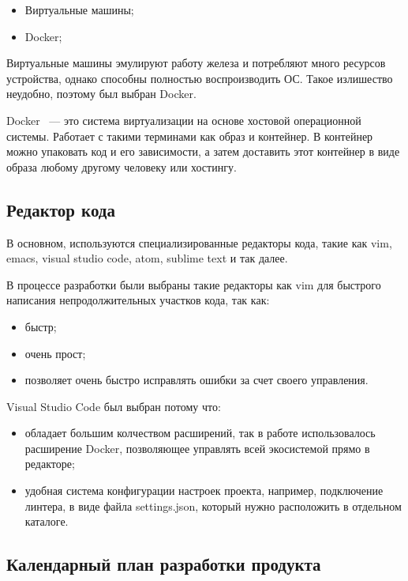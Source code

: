 \begin{itemize}
    \item Виртуальные машины;
    \item Docker;
\end{itemize}

Виртуальные машины эмулируют работу железа и потребляют много ресурсов устройства, однако способны полностью воспроизводить ОС. Такое излишество неудобно, поэтому был выбран
Docker.

Docker ~--- это система виртуализации на основе хостовой операционной системы. Работает с такими терминами как образ и контейнер. В контейнер можно упаковать код и его зависимости, а затем
доставить этот контейнер в виде образа любому другому человеку или хостингу.

\subsection{Редактор кода}

В основном, используются специализированные редакторы кода, такие как vim, emacs, visual studio code, atom, sublime text и так далее.

В процессе разработки были выбраны такие редакторы как vim для быстрого написания непродолжительных участков кода, так как:

\begin{itemize}
    \item быстр;
    \item очень прост;
    \item позволяет очень быстро исправлять ошибки за счет своего управления.
\end{itemize}

Visual Studio Code был выбран потому что:

\begin{itemize}
    \item обладает большим колчеством расширений, так в работе использовалось расширение Docker, позволяющее управлять всей экосистемой прямо в редакторе;
    \item удобная система конфигурации настроек проекта, например, подключение линтера, в виде файла settings.json, который нужно расположить в отдельном каталоге.
\end{itemize}

\subsection{Календарный план разработки продукта}

